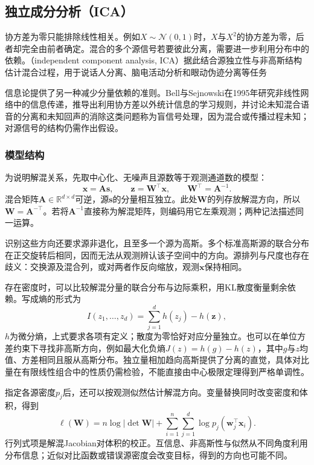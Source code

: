 \subsection{独立成分分析（ICA）}
\label{sec:dim-ica}

协方差为零只能排除线性相关。例如$X\sim\mathcal{N}(0,1)$时，$X$与$X^2$的协方差为零，后者却完全由前者确定。混合的多个源信号若要彼此分离，需要进一步利用分布中的依赖。（independent component analysis, ICA）据此结合源独立性与非高斯结构估计混合过程，用于说话人分离、脑电活动分析和眼动伪迹分离等任务

信息论提供了另一种减少分量依赖的准则。Bell与Sejnowski在1995年研究非线性网络中的信息传递，推导出利用协方差以外统计信息的学习规则，并讨论未知混合语音的分离和未知回声的消除这类问题称为盲信号处理，因为混合或传播过程未知；对源信号的结构仍需作出假设。

\subsubsection{模型结构}
\label{sec:dim-ica-structure}

为说明解混关系，先取中心化、无噪声且源数等于观测通道数的模型：
\begin{equation}
  \bm{x}=\bm{A}\bm{s},\qquad
  \bm{z}=\bm{W}^{\top}\bm{x},\qquad
  \bm{W}^{\top}=\bm{A}^{-1}.
  \label{eq:dim-ica-model}
\end{equation}
混合矩阵$\bm{A}\in\mathbb{R}^{d\times d}$可逆，源$\bm{s}$的分量相互独立。此处$\bm{W}$的列存放解混方向，所以$\bm{W}=\bm{A}^{-\top}$。若将$\bm{A}^{-1}$直接称为解混矩阵，则编码用它左乘观测；两种记法描述同一运算。

识别这些方向还要求源非退化，且至多一个源为高斯。多个标准高斯源的联合分布在正交旋转后相同，因而无法从观测辨认该子空间中的方向。源排列与尺度也存在歧义：交换源及混合列，或对两者作反向缩放，观测$\bm{x}$保持相同。

存在密度时，可以比较解混分量的联合分布与边际乘积，用KL散度衡量剩余依赖。写成熵的形式为
\[
  I(z_1,\ldots,z_d)
  =\sum_{j=1}^{d}h(z_j)-h(\bm{z}),
\]
$h$为微分熵，上式要求各项有定义；散度为零恰好对应分量独立。也可以在单位方差约束下寻找非高斯方向，例如最大化负熵$J(z)=h(g)-h(z)$，其中$g$与$z$均值、方差相同且服从高斯分布。独立量相加趋向高斯提供了分离的直觉，具体对比量在有限线性组合中的性质仍需检验，不能直接由中心极限定理得到严格单调性。

指定各源密度$p_j$后，还可以按观测似然估计解混方向。变量替换同时改变密度和体积，得到
\begin{equation}
  \ell(\bm{W})
  =n\log|\det\bm{W}|
   +\sum_{i=1}^{n}\sum_{j=1}^{d}
        \log p_j(\bm{w}_j^{\top}\bm{x}_i).
  \label{eq:dim-ica-likelihood}
\end{equation}
行列式项是解混Jacobian对体积的校正。互信息、非高斯性与似然从不同角度利用分布信息；近似对比函数或错误源密度会改变目标，得到的方向也可能不同。


